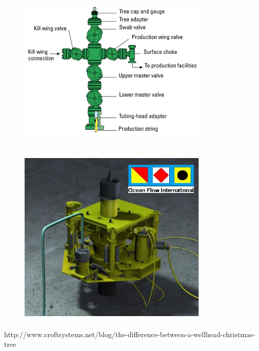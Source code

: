 \documentclass[DIV=calc, paper=a4, fontsize=13pt, twocolumn]{scrartcl}	 %
\begin{document}
\begin{figure}[h]
\includegraphics[width=9cm,height=8.5cm]{xmas_tree_diagram.png}
\includegraphics[width=9cm,height=8.5cm]{Ocean_Flow_Subsea_Tree_002.JPG}
\end{figure}





\newpage
\begin{thebibliography}{99} %


\newblock http://www.croftsystems.net/blog/the-difference-between-a-wellhead-christmas-tree
 
\end{thebibliography}


\end{document}

